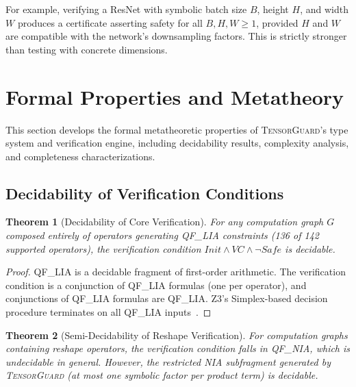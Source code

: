 \documentclass[10pt]{article}
\newcommand{\tguard}{\textsc{TensorGuard}}
\theoremstyle{plain}
\newtheorem{theorem}{Theorem}[section]
\theoremstyle{definition}
\theoremstyle{remark}
\begin{document}
\noindent
For example, verifying a ResNet with symbolic batch size $B$, height
$H$, and width $W$ produces a certificate asserting safety for all
$B, H, W \geq 1$, provided $H$ and $W$ are compatible with the
network's downsampling factors.  This is strictly stronger than
testing with concrete dimensions.


\section{Formal Properties and Metatheory}\label{sec:metatheory}

This section develops the formal metatheoretic properties of
\tguard{}'s type system and verification engine, including
decidability results, complexity analysis, and completeness
characterizations.

\subsection{Decidability of Verification Conditions}

\begin{theorem}[Decidability of Core Verification]\label{thm:decidable-core}
For any computation graph $G$ composed entirely of operators
generating QF\_LIA constraints (136 of 142 supported operators),
the verification condition
$\mathit{Init} \land \mathit{VC} \land \neg\mathit{Safe}$ is
decidable.
\end{theorem}

\begin{proof}
QF\_LIA is a decidable fragment of first-order arithmetic.  The
verification condition is a conjunction of QF\_LIA formulas (one
per operator), and conjunctions of QF\_LIA formulas are QF\_LIA.
Z3's Simplex-based decision procedure terminates on all QF\_LIA
inputs~\cite{leino10}.
\end{proof}

\begin{theorem}[Semi-Decidability of Reshape Verification]\label{thm:semidecidable}
For computation graphs containing reshape operators, the
verification condition falls in QF\_NIA, which is undecidable in
general.  However, the restricted NIA subfragment generated by
\tguard{} (at most one symbolic factor per product term) is
decidable.
\end{theorem}
\end{document}

